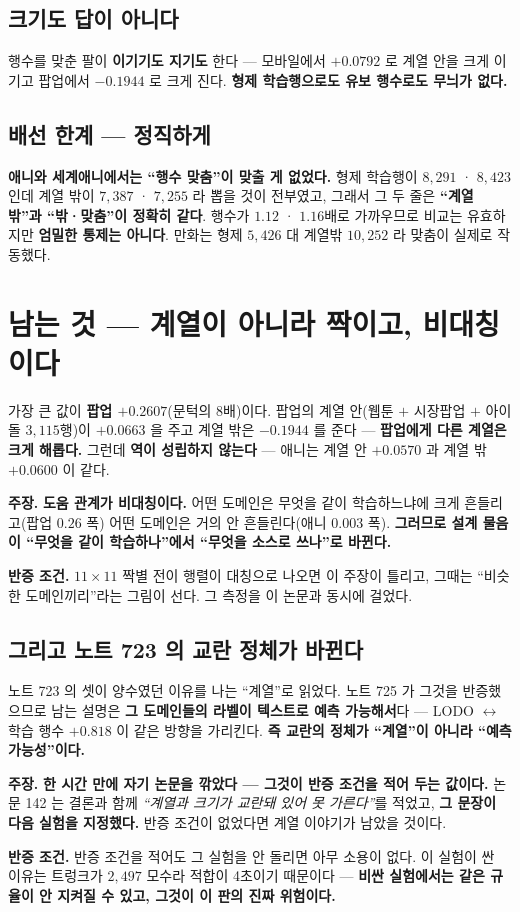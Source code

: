 \documentclass[10pt,a4paper]{article}
\newcommand{\claim}[2]{\begin{claimbox}\textbf{주장.} #1\par\smallskip
  \textcolor{gray!70}{\textbf{반증 조건.} #2}\end{claimbox}}
\begin{document}
\subsection*{크기도 답이 아니다}

행수를 맞춘 팔이 \textbf{이기기도 지기도} 한다 --- 모바일에서 $+0.0792$ 로 계열 안을
크게 이기고 팝업에서 $-0.1944$ 로 크게 진다. \textbf{형제 학습행으로도 유보
행수로도 무늬가 없다.}

\subsection*{배선 한계 --- 정직하게}

\textbf{애니와 세계애니에서는 ``행수 맞춤''이 맞출 게 없었다.} 형제 학습행이
$8{,}291$ · $8{,}423$ 인데 계열 밖이 $7{,}387$ · $7{,}255$ 라 뽑을 것이 전부였고,
그래서 그 두 줄은 \textbf{``계열 밖''과 ``밖·맞춤''이 정확히 같다}. 행수가 $1.12$ ·
$1.16$배로 가까우므로 비교는 유효하지만 \textbf{엄밀한 통제는 아니다}. 만화는 형제
$5{,}426$ 대 계열밖 $10{,}252$ 라 맞춤이 실제로 작동했다.

\section{남는 것 --- 계열이 아니라 짝이고, 비대칭이다}

가장 큰 값이 \textbf{팝업 $+0.2607$}(문턱의 $8$배)이다. 팝업의 계열 안(웹툰 $+$
시장팝업 $+$ 아이돌 $3{,}115$행)이 $+0.0663$ 을 주고 계열 밖은 $\mathbf{-0.1944}$ 를
준다 --- \textbf{팝업에게 다른 계열은 크게 해롭다.} 그런데 \textbf{역이 성립하지
않는다} --- 애니는 계열 안 $+0.0570$ 과 계열 밖 $+0.0600$ 이 같다.

\claim{\textbf{도움 관계가 비대칭이다.} 어떤 도메인은 무엇을 같이 학습하느냐에 크게
흔들리고(팝업 $0.26$ 폭) 어떤 도메인은 거의 안 흔들린다(애니 $0.003$ 폭).
\textbf{그러므로 설계 물음이 ``무엇을 같이 학습하나''에서 ``무엇을 소스로
쓰나''로 바뀐다.}}
{$11\times11$ 짝별 전이 행렬이 대칭으로 나오면 이 주장이 틀리고, 그때는 ``비슷한
도메인끼리''라는 그림이 선다. 그 측정을 이 논문과 동시에 걸었다.}

\subsection*{그리고 노트 723 의 교란 정체가 바뀐다}

노트 723 의 셋이 양수였던 이유를 나는 ``계열''로 읽었다. 노트 725 가 그것을
반증했으므로 남는 설명은 \textbf{그 도메인들의 라벨이 텍스트로 예측 가능해서}다
--- LODO $\leftrightarrow$ 학습 행수 $+0.818$ 이 같은 방향을 가리킨다.
\textbf{즉 교란의 정체가 ``계열''이 아니라 ``예측 가능성''이다.}

\claim{\textbf{한 시간 만에 자기 논문을 깎았다 --- 그것이 반증 조건을 적어 두는
값이다.} 논문 142 는 결론과 함께 \emph{``계열과 크기가 교란돼 있어 못 가른다''}를
적었고, \textbf{그 문장이 다음 실험을 지정했다.} 반증 조건이 없었다면 계열 이야기가
남았을 것이다.}
{반증 조건을 적어도 그 실험을 안 돌리면 아무 소용이 없다. 이 실험이 싼 이유는
트렁크가 $2{,}497$ 모수라 적합이 4초이기 때문이다 --- \textbf{비싼 실험에서는 같은
규율이 안 지켜질 수 있고, 그것이 이 판의 진짜 위험이다.}}
\end{document}

